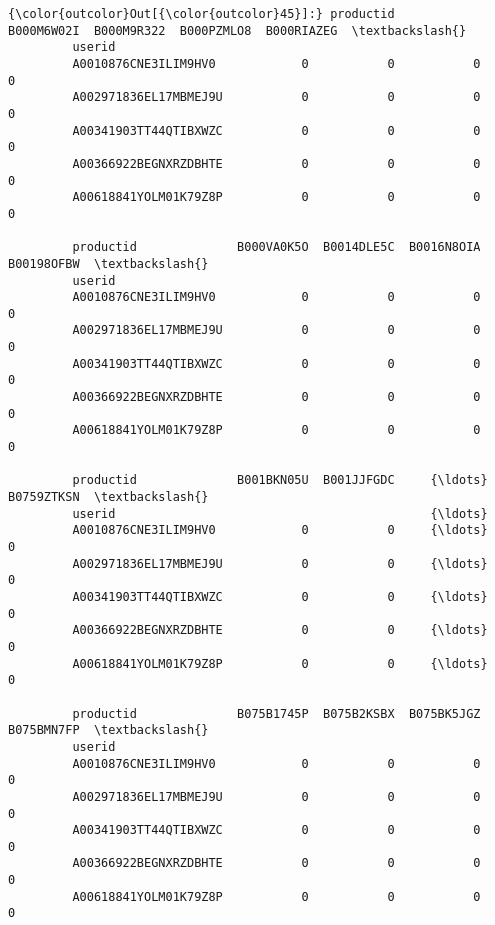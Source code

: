 \documentclass[11pt]{article}
\begin{document}
\begin{Verbatim}[commandchars=\\\{\}]
{\color{outcolor}Out[{\color{outcolor}45}]:} productid              B000M6W02I  B000M9R322  B000PZMLO8  B000RIAZEG  \textbackslash{}
         userid                                                                  
         A0010876CNE3ILIM9HV0            0           0           0           0   
         A002971836EL17MBMEJ9U           0           0           0           0   
         A00341903TT44QTIBXWZC           0           0           0           0   
         A00366922BEGNXRZDBHTE           0           0           0           0   
         A00618841YOLM01K79Z8P           0           0           0           0   
         
         productid              B000VA0K5O  B0014DLE5C  B0016N8OIA  B00198OFBW  \textbackslash{}
         userid                                                                  
         A0010876CNE3ILIM9HV0            0           0           0           0   
         A002971836EL17MBMEJ9U           0           0           0           0   
         A00341903TT44QTIBXWZC           0           0           0           0   
         A00366922BEGNXRZDBHTE           0           0           0           0   
         A00618841YOLM01K79Z8P           0           0           0           0   
         
         productid              B001BKN05U  B001JJFGDC     {\ldots}      B0759ZTKSN  \textbackslash{}
         userid                                            {\ldots}                   
         A0010876CNE3ILIM9HV0            0           0     {\ldots}               0   
         A002971836EL17MBMEJ9U           0           0     {\ldots}               0   
         A00341903TT44QTIBXWZC           0           0     {\ldots}               0   
         A00366922BEGNXRZDBHTE           0           0     {\ldots}               0   
         A00618841YOLM01K79Z8P           0           0     {\ldots}               0   
         
         productid              B075B1745P  B075B2KSBX  B075BK5JGZ  B075BMN7FP  \textbackslash{}
         userid                                                                  
         A0010876CNE3ILIM9HV0            0           0           0           0   
         A002971836EL17MBMEJ9U           0           0           0           0   
         A00341903TT44QTIBXWZC           0           0           0           0   
         A00366922BEGNXRZDBHTE           0           0           0           0   
         A00618841YOLM01K79Z8P           0           0           0           0   
         

\end{Verbatim}
\end{document}
